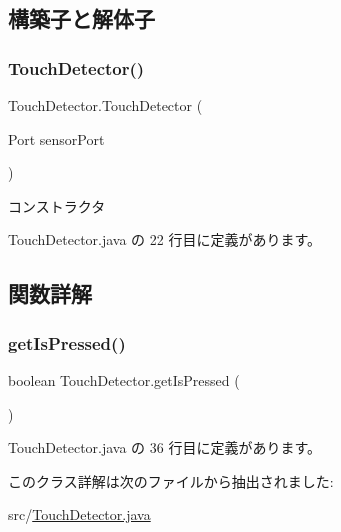 \subsection{構築子と解体子}
\mbox{\label{class_touch_detector_ad4818fd917a3b42985865c4e2000c3c0}} 
\subsubsection{\texorpdfstring{TouchDetector()}{TouchDetector()}}
{\footnotesize\ttfamily Touch\+Detector.\+Touch\+Detector (\begin{DoxyParamCaption}\item[{Port}]{sensor\+Port }\end{DoxyParamCaption})\hspace{0.3cm}{\ttfamily [inline]}}

コンストラクタ 

 Touch\+Detector.\+java の 22 行目に定義があります。



\subsection{関数詳解}
\mbox{\label{class_touch_detector_a118eac6be889816032f993694a8dd808}} 
\subsubsection{\texorpdfstring{getIsPressed()}{getIsPressed()}}
{\footnotesize\ttfamily boolean Touch\+Detector.\+get\+Is\+Pressed (\begin{DoxyParamCaption}{ }\end{DoxyParamCaption})\hspace{0.3cm}{\ttfamily [inline]}}



 Touch\+Detector.\+java の 36 行目に定義があります。



このクラス詳解は次のファイルから抽出されました\+:\begin{DoxyCompactItemize}
\item 
src/\mbox{\hyperlink{_touch_detector_8java}{Touch\+Detector.\+java}}\end{DoxyCompactItemize}
